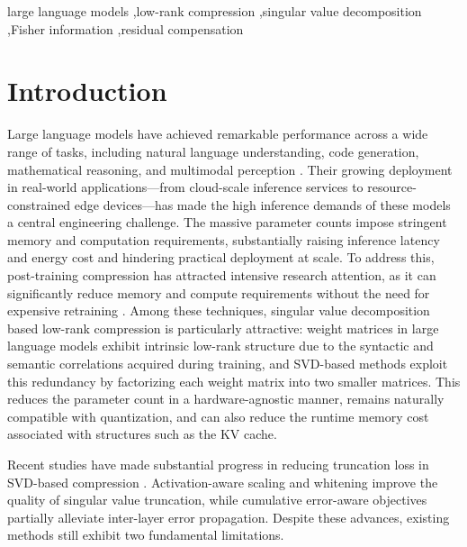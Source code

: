 \documentclass[a4paper,fleqn]{cas-dc}
\begin{document}
\begin{keywords}
large language models \sep low-rank compression \sep singular value decomposition \sep Fisher information \sep residual compensation
\end{keywords}

\maketitle

\section{Introduction}

Large language models have achieved remarkable performance across a wide range of tasks, including natural language understanding, code generation, mathematical reasoning, and multimodal perception \citep{touvron2023llama,touvron2023llama2,dubey2024llama3}. Their growing deployment in real-world applications---from cloud-scale inference services to resource-constrained edge devices---has made the high inference demands of these models a central engineering challenge. The massive parameter counts impose stringent memory and computation requirements, substantially raising inference latency and energy cost and hindering practical deployment at scale. To address this, post-training compression has attracted intensive research attention, as it can significantly reduce memory and compute requirements without the need for expensive retraining \citep{frantar2023gptq,lin2023awq,frantar2023sparsegpt,ma2023llmpruner,ashkboos2024slicegpt}. Among these techniques, singular value decomposition based low-rank compression is particularly attractive: weight matrices in large language models exhibit intrinsic low-rank structure due to the syntactic and semantic correlations acquired during training, and SVD-based methods exploit this redundancy by factorizing each weight matrix into two smaller matrices. This reduces the parameter count in a hardware-agnostic manner, remains naturally compatible with quantization, and can also reduce the runtime memory cost associated with structures such as the KV cache.

Recent studies have made substantial progress in reducing truncation loss in SVD-based compression \citep{yuan2023asvd,wang2025svdllm,wang2025svdllmv2,saessvd2025,li2025adasvd,wang2025dobisvd}. Activation-aware scaling and whitening improve the quality of singular value truncation, while cumulative error-aware objectives partially alleviate inter-layer error propagation. Despite these advances, existing methods still exhibit two fundamental limitations.
\end{document}
